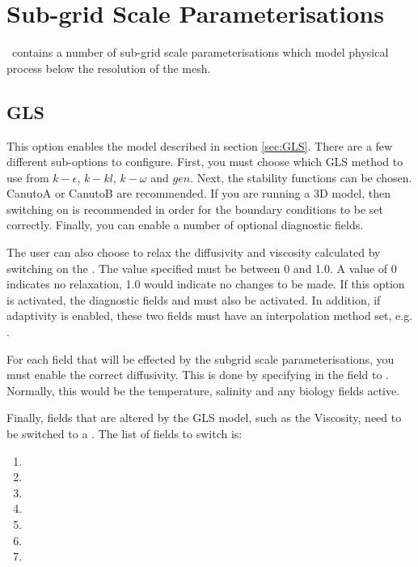 \section{Sub-grid Scale Parameterisations}
\label{sec:sub-grid-scale-parameterisations}

\fluidity\ contains a number of sub-grid scale parameterisations which model physical process below the resolution of the mesh.

\subsection{GLS}

This option enables the model described in section \ref{sec:GLS}. There are a few different
sub-options to configure. First, you must choose which GLS method to use
from $k-\epsilon$, $k-kl$, $k-\omega$ and $gen$. Next, the stability functions
can be chosen. CanutoA or CanutoB are recommended. If you are running a 3D model, then switching on
 is recommended in order for the boundary conditions to be set correctly.
Finally, you can enable a number of optional diagnostic fields.

The user can also choose to relax the diffusivity and viscosity calculated by switching on the\linebreak
{}. The value specified must be between 0 and 1.0. A value of 0 indicates
no relaxation, 1.0 would indicate no changes to be made. If this option is activated, the diagnostic fields
 and  must also
be activated. In addition, if adaptivity is enabled, these two fields must have an interpolation
method set, e.g. .

For each field that will be effected by the subgrid scale parameterisations,
you must enable the correct diffusivity. This
is done by specifying  in the
field to . Normally, this would be the temperature, salinity and any biology fields active.

Finally, fields that are altered by the GLS model, such as the Viscosity, need to be switched
to a . The list of fields to switch is:
\begin{enumerate}
\item {}
\item {}
\item {}
\item {}
\item {}
\item {}
\item {}
\end{enumerate}

